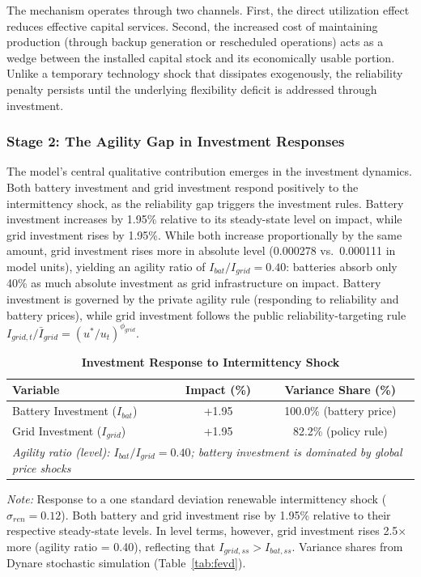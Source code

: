 \documentclass[12pt, a4paper]{article}
\begin{document}
The mechanism operates through two channels. First, the direct utilization effect reduces effective capital services. Second, the increased cost of maintaining production (through backup generation or rescheduled operations) acts as a wedge between the installed capital stock and its economically usable portion. Unlike a temporary technology shock that dissipates exogenously, the reliability penalty persists until the underlying flexibility deficit is addressed through investment.

\subsubsection{Stage 2: The Agility Gap in Investment Responses}

The model's central qualitative contribution emerges in the investment dynamics. Both battery investment and grid investment respond positively to the intermittency shock, as the reliability gap triggers the investment rules. Battery investment increases by 1.95\% relative to its steady-state level on impact, while grid investment rises by 1.95\%. While both increase proportionally by the same amount, grid investment rises more in absolute level (0.000278 vs.\ 0.000111 in model units), yielding an agility ratio of $I_{bat}/I_{grid} = 0.40$: batteries absorb only 40\% as much absolute investment as grid infrastructure on impact. Battery investment is governed by the private agility rule (responding to reliability and battery prices), while grid investment follows the public reliability-targeting rule $I_{grid,t}/\bar{I}_{grid} = (u^*/u_t)^{\phi_{grid}}$.

\begin{table}[H]
    \centering
    \caption{\textbf{Investment Response to Intermittency Shock}}
    \label{tab:agility_differential}
    \renewcommand{\arraystretch}{1.3}
    \begin{tabular}{l c c}
        \toprule
        \textbf{Variable} & \textbf{Impact (\%)} & \textbf{Variance Share (\%)} \\
        \midrule
        Battery Investment ($I_{bat}$) & +1.95 & 100.0\% (battery price) \\
        Grid Investment ($I_{grid}$) & +1.95 & 82.2\% (policy rule) \\
        \midrule
        \multicolumn{3}{l}{\textit{Agility ratio (level): $I_{bat}/I_{grid} = 0.40$; battery investment is dominated by global price shocks}} \\
        \bottomrule
    \end{tabular}
    \vspace{0.2cm}
    \parbox{\textwidth}{\footnotesize \textit{Note:} Response to a one standard deviation renewable intermittency shock ($\sigma_{ren} = 0.12$). Both battery and grid investment rise by 1.95\% relative to their respective steady-state levels. In level terms, however, grid investment rises 2.5$\times$ more (agility ratio = 0.40), reflecting that $I_{grid,ss} > I_{bat,ss}$. Variance shares from Dynare stochastic simulation (Table~\ref{tab:fevd}).}
\end{table}
\end{document}
